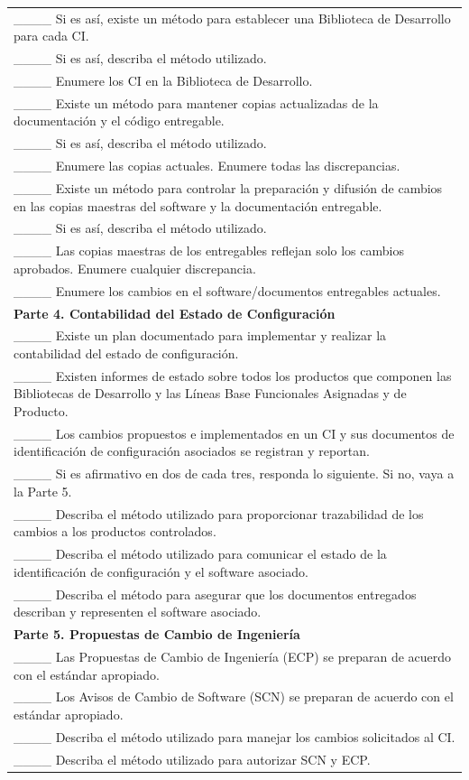 \begin{table}[H]
\begin{tabular}{|p{14cm}|}
\_\_\_\_ Si es así, existe un método para establecer una Biblioteca de Desarrollo para cada CI. \\
\_\_\_\_ Si es así, describa el método utilizado. \\
\_\_\_\_ Enumere los CI en la Biblioteca de Desarrollo. \\
\_\_\_\_ Existe un método para mantener copias actualizadas de la documentación y el código entregable. \\
\_\_\_\_ Si es así, describa el método utilizado. \\
\_\_\_\_ Enumere las copias actuales. Enumere todas las discrepancias. \\
\_\_\_\_ Existe un método para controlar la preparación y difusión de cambios en las copias maestras del software y la documentación entregable. \\
\_\_\_\_ Si es así, describa el método utilizado. \\
\_\_\_\_ Las copias maestras de los entregables reflejan solo los cambios aprobados. Enumere cualquier discrepancia. \\
\_\_\_\_ Enumere los cambios en el software/documentos entregables actuales. \\
\textbf{Parte 4. Contabilidad del Estado de Configuración} \\
\_\_\_\_ Existe un plan documentado para implementar y realizar la contabilidad del estado de configuración. \\
\_\_\_\_ Existen informes de estado sobre todos los productos que componen las Bibliotecas de Desarrollo y las Líneas Base Funcionales Asignadas y de Producto. \\
\_\_\_\_ Los cambios propuestos e implementados en un CI y sus documentos de identificación de configuración asociados se registran y reportan. \\
\_\_\_\_ Si es afirmativo en dos de cada tres, responda lo siguiente. Si no, vaya a la Parte 5. \\
\_\_\_\_ Describa el método utilizado para proporcionar trazabilidad de los cambios a los productos controlados. \\
\_\_\_\_ Describa el método utilizado para comunicar el estado de la identificación de configuración y el software asociado. \\
\_\_\_\_ Describa el método para asegurar que los documentos entregados describan y representen el software asociado. \\
\textbf{Parte 5. Propuestas de Cambio de Ingeniería} \\
\_\_\_\_ Las Propuestas de Cambio de Ingeniería (ECP) se preparan de acuerdo con el estándar apropiado. \\
\_\_\_\_ Los Avisos de Cambio de Software (SCN) se preparan de acuerdo con el estándar apropiado. \\
\_\_\_\_ Describa el método utilizado para manejar los cambios solicitados al CI. \\
\_\_\_\_ Describa el método utilizado para autorizar SCN y ECP. \\
\hline
\end{tabular}
\end{table}

